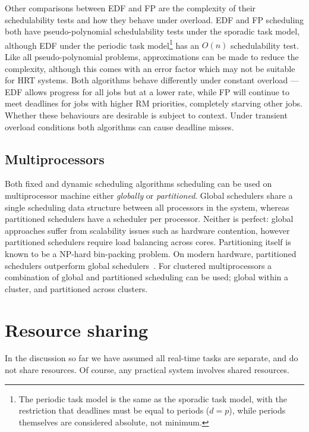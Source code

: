 Other comparisons between \gls{EDF} and \gls{FP} are the complexity of their schedulability tests
and how they behave under overload.  \gls{EDF} and \gls{FP} scheduling both have pseudo-polynomial
schedulability tests under the sporadic task model, although \gls{EDF} under the periodic task
model\footnote{The periodic task model is the same as the sporadic task model, with the restriction
that deadlines must be equal to periods ($d = p$), while periods themselves are considered absolute,
not minimum.} has an $O(n)$ schedulability test.  Like all pseudo-polynomial problems,
approximations can be made to reduce the complexity, although this comes with an error factor which
may not be suitable for \gls{HRT} systems.  Both algorithms behave differently under constant
overload --- \gls{EDF} allows progress for all jobs but at a lower rate, while \gls{FP} will
continue to meet deadlines for jobs with higher \gls{RM} priorities, completely starving other
jobs. Whether these behaviours are desirable is subject to context.  Under
transient overload conditions both algorithms can cause deadline misses.

\subsection{Multiprocessors}

Both fixed and dynamic scheduling algorithms scheduling can be used on multiprocessor machine either
\emph{globally} or \emph{partitioned}. Global schedulers share a single scheduling data structure
between all processors in the system, whereas partitioned schedulers have a scheduler per processor.
 Neither is perfect: global approaches suffer from scalability issues such as hardware contention,
 however partitioned schedulers require load balancing across cores.
Partitioning itself is known to be a NP-hard bin-packing problem.
On modern hardware, partitioned schedulers outperform global schedulers~\citep{Brandenburg:phd}.
For clustered multiprocessors a combination of global and partitioned scheduling can be used; global
within a cluster, and partitioned across clusters.

\section{Resource sharing}
\label{sec:resource-sharing-theory}

In the discussion so far we have assumed all real-time tasks are separate, and do not share resources.
Of course, any practical system involves shared resources.

